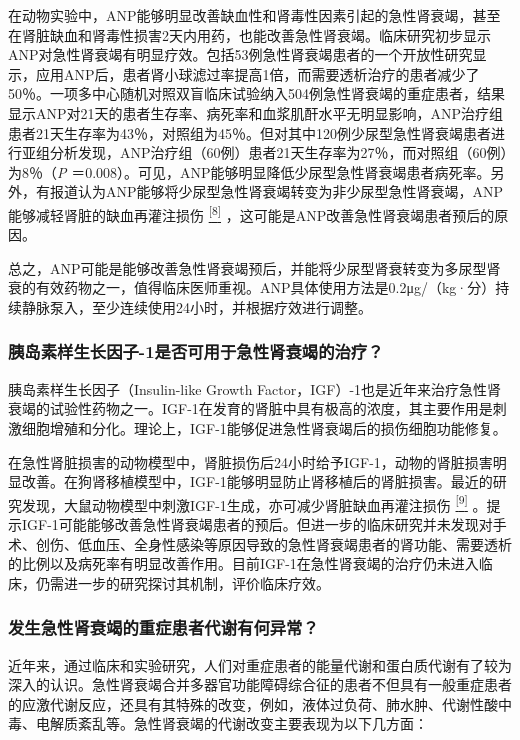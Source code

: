 在动物实验中，ANP能够明显改善缺血性和肾毒性因素引起的急性肾衰竭，甚至在肾脏缺血和肾毒性损害2天内用药，也能改善急性肾衰竭。临床研究初步显示ANP对急性肾衰竭有明显疗效。包括53例急性肾衰竭患者的一个开放性研究显示，应用ANP后，患者肾小球滤过率提高1倍，而需要透析治疗的患者减少了50％。一项多中心随机对照双盲临床试验纳入504例急性肾衰竭的重症患者，结果显示ANP对21天的患者生存率、病死率和血浆肌酐水平无明显影响，ANP治疗组患者21天生存率为43％，对照组为45％。但对其中120例少尿型急性肾衰竭患者进行亚组分析发现，ANP治疗组（60例）患者21天生存率为27％，而对照组（60例）为8％（\emph{P}
＝0.008）。可见，ANP能够明显降低少尿型急性肾衰竭患者病死率。另外，有报道认为ANP能够将少尿型急性肾衰竭转变为非少尿型急性肾衰竭，ANP能够减轻肾脏的缺血再灌注损伤
\protect\hyperlink{text00017.htmlux5cux23ch8-16}{\textsuperscript{{[}8{]}}}
，这可能是ANP改善急性肾衰竭患者预后的原因。

总之，ANP可能是能够改善急性肾衰竭预后，并能将少尿型肾衰转变为多尿型肾衰的有效药物之一，值得临床医师重视。ANP具体使用方法是0.2μg/（kg·分）持续静脉泵入，至少连续使用24小时，并根据疗效进行调整。

\subsubsection{胰岛素样生长因子-1是否可用于急性肾衰竭的治疗？}

胰岛素样生长因子（Insulin-like Growth
Factor，IGF）-1也是近年来治疗急性肾衰竭的试验性药物之一。IGF-1在发育的肾脏中具有极高的浓度，其主要作用是刺激细胞增殖和分化。理论上，IGF-1能够促进急性肾衰竭后的损伤细胞功能修复。

在急性肾脏损害的动物模型中，肾脏损伤后24小时给予IGF-1，动物的肾脏损害明显改善。在狗肾移植模型中，IGF-1能够明显防止肾移植后的肾脏损害。最近的研究发现，大鼠动物模型中刺激IGF-1生成，亦可减少肾脏缺血再灌注损伤
\protect\hyperlink{text00017.htmlux5cux23ch9-16}{\textsuperscript{{[}9{]}}}
。提示IGF-1可能能够改善急性肾衰竭患者的预后。但进一步的临床研究并未发现对手术、创伤、低血压、全身性感染等原因导致的急性肾衰竭患者的肾功能、需要透析的比例以及病死率有明显改善作用。目前IGF-1在急性肾衰竭的治疗仍未进入临床，仍需进一步的研究探讨其机制，评价临床疗效。

\subsubsection{发生急性肾衰竭的重症患者代谢有何异常？}

近年来，通过临床和实验研究，人们对重症患者的能量代谢和蛋白质代谢有了较为深入的认识。急性肾衰竭合并多器官功能障碍综合征的患者不但具有一般重症患者的应激代谢反应，还具有其特殊的改变，例如，液体过负荷、肺水肿、代谢性酸中毒、电解质紊乱等。急性肾衰竭的代谢改变主要表现为以下几方面：

